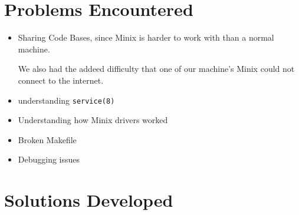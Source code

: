 \documentclass[11pt]{article}
\begin{document}
\section{Problems Encountered}
   
   \begin{itemize} 
      
      \item Sharing Code Bases, since Minix is harder to work with than a normal machine.

         We also had the addeed difficulty that one of our machine's Minix could not connect to the internet. 

      \item understanding {\tt service(8)}

      \item Understanding how Minix drivers worked

      \item Broken Makefile

      \item Debugging issues

   \end{itemize}


\section{Solutions Developed}
\end{document}

